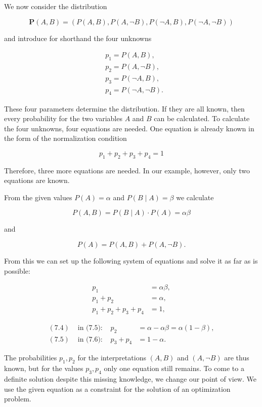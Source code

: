 \documentclass[10pt]{article}
\begin{document}
We now consider the distribution

$$
\boldsymbol{P}(A, B)=(P(A, B), P(A, \neg B), P(\neg A, B), P(\neg A, \neg B))
$$

and introduce for shorthand the four unknowns

$$
\begin{aligned}
& p_{1}=P(A, B), \\
& p_{2}=P(A, \neg B), \\
& p_{3}=P(\neg A, B), \\
& p_{4}=P(\neg A, \neg B) .
\end{aligned}
$$

These four parameters determine the distribution. If they are all known, then every probability for the two variables $A$ and $B$ can be calculated. To calculate the four unknowns, four equations are needed. One equation is already known in the form of the normalization condition

$$
p_{1}+p_{2}+p_{3}+p_{4}=1
$$

Therefore, three more equations are needed. In our example, however, only two equations are known.

From the given values $P(A)=\alpha$ and $P(B \mid A)=\beta$ we calculate

$$
P(A, B)=P(B \mid A) \cdot P(A)=\alpha \beta
$$

and

$$
P(A)=P(A, B)+P(A, \neg B) .
$$

From this we can set up the following system of equations and solve it as far as is possible:


\begin{align*}
p_{1} & =\alpha \beta,  \tag{7.4}\\
p_{1}+p_{2} & =\alpha,  \tag{7.5}\\
p_{1}+p_{2}+p_{3}+p_{4} & =1, \tag{7.6}
\end{align*}



\begin{align*}
(7.4) & \text { in (7.5): } & p_{2} & =\alpha-\alpha \beta=\alpha(1-\beta),  \tag{7.7}\\
(7.5) & \text { in (7.6): } & p_{3}+p_{4} & =1-\alpha . \tag{7.8}
\end{align*}


The probabilities $p_{1}, p_{2}$ for the interpretations $(A, B)$ and $(A, \neg B)$ are thus known, but for the values $p_{3}, p_{4}$ only one equation still remains. To come to a definite solution despite this missing knowledge, we change our point of view. We use the given equation as a constraint for the solution of an optimization problem.
\end{document}
